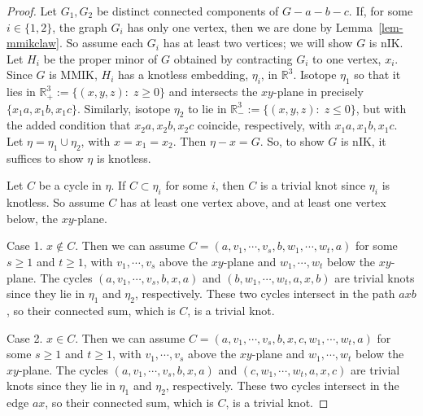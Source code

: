 \documentclass[10pt,a4paper]{amsart}
\newcommand{\R}{\mathbb R}
\newcommand{\st}{: \;}
\begin{document}
\begin{proof}
Let $G_1, G_2$ be distinct connected components of $G -a-b-c$.
If, for some $i \in \{1,2\}$, the graph $G_i$ has only one vertex,
then we are done  by Lemma~\ref{lem-mmikclaw}.
So assume each $G_i$ has at least two vertices; we will show $G$ is nIK.
Let $H_i$ be the proper minor of $G$ obtained by contracting $G_i$ to one vertex, $x_i$.
Since $G$ is MMIK, $H_i$ has a knotless embedding, $\eta_i$, in $\R^3$.
Isotope $\eta_1$ so that it lies in $\R^3_+ := \{(x,y,z) \st z \ge 0\}$
and intersects the $xy$-plane in precisely $\{x_1a, x_1b, x_1c\}$.
Similarly, isotope $\eta_2$ to lie in $\R^3_- := \{(x,y,z) \st z \le 0\}$,
but with the added condition that $x_2 a, x_2 b, x_2 c$ coincide, respectively, 
with   $x_1 a, x_1 b, x_1 c$.
Let $\eta = \eta_1 \cup \eta_2$,
with $x = x_1 = x_2$.
Then $\eta - x =G$.
So, to show $G$ is nIK, it suffices to show $\eta$ is knotless.

Let $C$ be a cycle in $\eta$.
If $C \subset \eta_i$ for some $i$,
then $C$ is a trivial knot since $\eta_i$ is knotless.
So assume $C$ has 
at least one vertex above, and at least one vertex below, the $xy$-plane.

Case 1. 
$x \not \in C$.
Then we can assume 
$C= (a, v_1, \cdots, v_s, b, w_1, \cdots, w_t, a)$
for some $s \ge 1$ and $t \ge 1$, 
with $v_1, \cdots, v_s$ above the $xy$-plane
and $w_1, \cdots, w_t$ below the $xy$-plane.
The cycles 
$(a, v_1, \cdots, v_s, b, x, a)$ and
$(b, w_1, \cdots, w_t, a, x, b)$
are trivial knots since they lie in $\eta_1$ and $\eta_2$, respectively.
These two cycles intersect in the path $axb$,
so their connected sum, which is $C$, is a trivial knot.

Case 2. 
$x \in C$.
Then we can assume 
$C= (a, v_1, \cdots, v_s, b, x, c, w_1, \cdots, w_t, a)$
for some $s \ge 1$ and $t \ge 1$, 
with $v_1, \cdots, v_s$ above the $xy$-plane
and $w_1, \cdots, w_t$ below the $xy$-plane.
The cycles 
$(a, v_1, \cdots, v_s, b, x, a)$ and
$(c, w_1, \cdots, w_t, a, x, c)$
are trivial knots since they lie in $\eta_1$ and $\eta_2$, respectively.
These two cycles intersect in the edge $ax$,
so their connected sum, which is $C$, is a trivial knot.
\end{proof}
\end{document}
